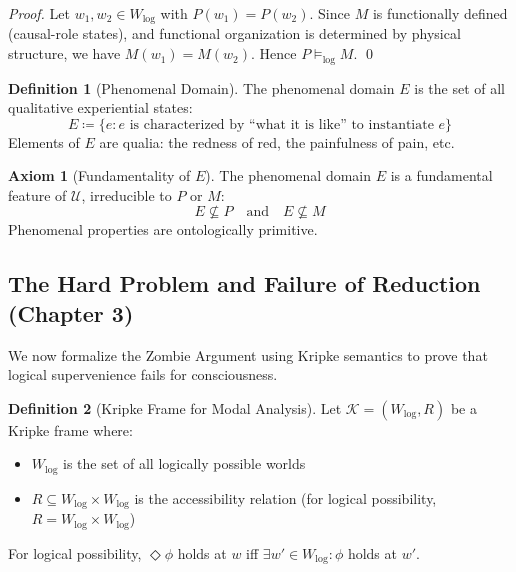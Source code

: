 \documentclass[11pt,a4paper]{article}
\theoremstyle{definition}
\newtheorem{definition}{Definition}[section]
\newtheorem{axiom}{Axiom}[section]
\theoremstyle{plain}
\theoremstyle{remark}
\newcommand{\logent}{\vDash_{\text{log}}}
\newcommand{\Wlog}{W_{\text{log}}}
\begin{document}
\begin{proof}
Let $w_1, w_2 \in \Wlog$ with $P(w_1) = P(w_2)$. Since $M$ is functionally defined (causal-role states), and functional organization is determined by physical structure, we have $M(w_1) = M(w_2)$. Hence $P \logent M$. \qed
\end{proof}

\begin{definition}[Phenomenal Domain]
The phenomenal domain $E$ is the set of all qualitative experiential states:
\begin{equation}
E \coloneqq \{ e : e \text{ is characterized by ``what it is like'' to instantiate } e \}
\end{equation}
Elements of $E$ are qualia: the redness of red, the painfulness of pain, etc.
\end{definition}

\begin{axiom}[Fundamentality of $E$]\label{ax:fundamental_E}
The phenomenal domain $E$ is a fundamental feature of $\mathcal{U}$, irreducible to $P$ or $M$:
\begin{equation}
E \not\subseteq P \quad \text{and} \quad E \not\subseteq M
\end{equation}
Phenomenal properties are ontologically primitive.
\end{axiom}

\subsection{The Hard Problem and Failure of Reduction (Chapter 3)}

We now formalize the Zombie Argument using Kripke semantics to prove that logical supervenience fails for consciousness.

\begin{definition}[Kripke Frame for Modal Analysis]
Let $\mathcal{K} = (\Wlog, R)$ be a Kripke frame where:
\begin{itemize}[nosep]
    \item $\Wlog$ is the set of all logically possible worlds
    \item $R \subseteq \Wlog \times \Wlog$ is the accessibility relation (for logical possibility, $R = \Wlog \times \Wlog$)
\end{itemize}
For logical possibility, $\Diamond \phi$ holds at $w$ iff $\exists w' \in \Wlog: \phi$ holds at $w'$.
\end{definition}
\end{document}
